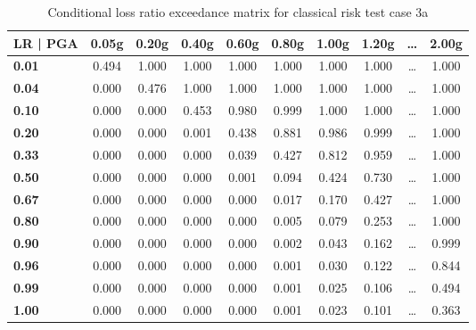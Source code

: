 \begin{table}[htbp]

\centering
\begin{tabular}{ l c c c c c c c c c }

\hline
\rowcolor{anti-flashwhite}
\bf{LR | PGA} & \bf{0.05g} & \bf{0.20g} & \bf{0.40g} & \bf{0.60g} & \bf{0.80g} & \bf{1.00g} & \bf{1.20g} & \bf{\dots} & \bf{2.00g} \\
\hline
\bf{0.01} & 0.494 & 1.000 & 1.000 & 1.000 & 1.000 & 1.000 & 1.000 & \dots & 1.000 \\
\bf{0.04} & 0.000 & 0.476 & 1.000 & 1.000 & 1.000 & 1.000 & 1.000 & \dots & 1.000 \\
\bf{0.10} & 0.000 & 0.000 & 0.453 & 0.980 & 0.999 & 1.000 & 1.000 & \dots & 1.000 \\
\bf{0.20} & 0.000 & 0.000 & 0.001 & 0.438 & 0.881 & 0.986 & 0.999 & \dots & 1.000 \\
\bf{0.33} & 0.000 & 0.000 & 0.000 & 0.039 & 0.427 & 0.812 & 0.959 & \dots & 1.000 \\
\bf{0.50} & 0.000 & 0.000 & 0.000 & 0.001 & 0.094 & 0.424 & 0.730 & \dots & 1.000 \\
\bf{0.67} & 0.000 & 0.000 & 0.000 & 0.000 & 0.017 & 0.170 & 0.427 & \dots & 1.000 \\
\bf{0.80} & 0.000 & 0.000 & 0.000 & 0.000 & 0.005 & 0.079 & 0.253 & \dots & 1.000 \\
\bf{0.90} & 0.000 & 0.000 & 0.000 & 0.000 & 0.002 & 0.043 & 0.162 & \dots & 0.999 \\
\bf{0.96} & 0.000 & 0.000 & 0.000 & 0.000 & 0.001 & 0.030 & 0.122 & \dots & 0.844 \\
\bf{0.99} & 0.000 & 0.000 & 0.000 & 0.000 & 0.001 & 0.025 & 0.106 & \dots & 0.494 \\
\bf{1.00} & 0.000 & 0.000 & 0.000 & 0.000 & 0.001 & 0.023 & 0.101 & \dots & 0.363 \\
\hline
\end{tabular}

\caption{Conditional loss ratio exceedance matrix for classical risk test case 3a}
\label{tab:lrem-ln-tax1-nzcov-75}
\end{table}